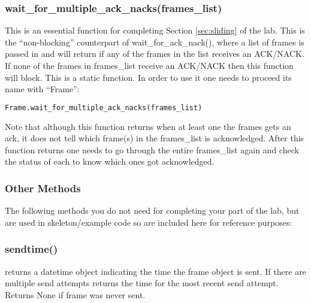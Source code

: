 \documentclass[11pt]{article}
\begin{document}
\subsubsection{wait\_for\_multiple\_ack\_nacks(frames\_list)}
This is an essential function for completing Section \ref{sec:sliding} of the lab. This is the ``non-blocking'' counterpart of wait\_for\_ack\_nack(), where a list of frames is passed in and will return if any of the frames in the list receives an ACK/NACK. If none of the frames in frames\_list receive an ACK/NACK then this function will block. This is a static function. In order to use it one needs to proceed its name with ``Frame'':
\begin{lstlisting}[caption={Frame status}, language=python]
Frame.wait_for_multiple_ack_nacks(frames_list)
\end{lstlisting}
Note that although this function returns when at least one the frames gets an ack, it does not tell which frame(s) in the frames\_list is acknowledged. After this function returns one needs to go through the entire frames\_list again and check the status of each to know which ones got acknowledged.

\subsubsection{Other Methods}
The following methods you do not need for completing your part of the lab, but are used in skeleton/example code so are included here for reference purposes:

\subsubsection{sendtime()}
returns a datetime object indicating the time the frame object is sent. If there are multiple send attempts returns the time for the most recent send attempt. Returns None if frame was never sent.
\end{document}
